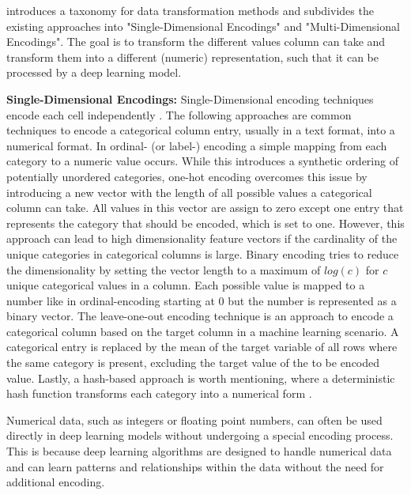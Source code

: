 \label{sec:dataTransformation}

\cite{borisov2022DeepNeuralNetworks} introduces a taxonomy for data transformation methods and subdivides the existing approaches into "Single-Dimensional Encodings" and "Multi-Dimensional Encodings".
The goal is to transform the different values column can take and transform them into a different (numeric) representation, such that it can be processed by a deep learning model.

\textbf{Single-Dimensional Encodings:}
Single-Dimensional encoding techniques encode each cell independently \cite{borisov2022DeepNeuralNetworks}.
The following approaches are common techniques to encode a categorical column entry, usually in a text format, into a numerical format.
In ordinal- (or label-) encoding a simple mapping from each category to a numeric value occurs. 
While this introduces a synthetic ordering of potentially unordered categories, one-hot encoding overcomes this issue by introducing a new vector with the length of all possible values a categorical column can take.
All values in this vector are assign to zero except one entry that represents the category that should be encoded, which is set to one.
However, this approach can lead to high dimensionality feature vectors if the cardinality of the unique categories in categorical columns is large.
Binary encoding tries to reduce the dimensionality by setting the vector length to a maximum of $log(c)$ for $c$ unique categorical values in a column.
Each possible value is mapped to a number like in ordinal-encoding starting at 0 but the number is represented as a binary vector.
The leave-one-out encoding technique is an approach to encode a categorical column based on the target column in a machine learning scenario. 
A categorical entry is replaced by the mean of the target variable of all rows where the same category is present, excluding the target value of the to be encoded value.
Lastly, a hash-based approach is worth mentioning, where a deterministic hash function transforms each category into a numerical form \cite{borisov2022DeepNeuralNetworks}.

Numerical data, such as integers or floating point numbers, can often be used directly in deep learning models without undergoing a special encoding process. 
This is because deep learning algorithms are designed to handle numerical data and can learn patterns and relationships within the data without the need for additional encoding.

